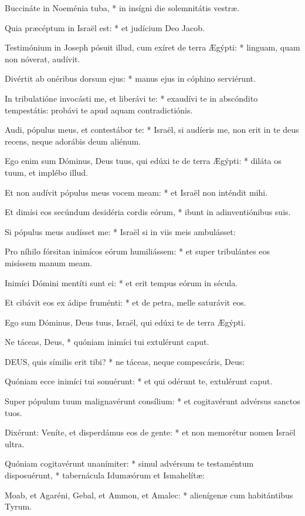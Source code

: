 Buccináte in Noeménia tuba, * in insígni die solemnitátis vestræ.

Quia præcéptum in Israël est: * et judícium Deo Jacob.

Testimónium in Joseph pósuit illud, cum exíret de terra Ægýpti: * linguam, quam non nóverat, audívit.

Divértit ab onéribus dorsum ejus: * manus ejus in cóphino serviérunt.

In tribulatióne invocásti me, et liberávi te: * exaudívi te in abscóndito tempestátis: probávi te apud aquam contradictiónis.

Audi, pópulus meus, et contestábor te: * Israël, si audíeris me, non erit in te deus recens, neque adorábis deum aliénum.

Ego enim sum Dóminus, Deus tuus, qui edúxi te de terra Ægýpti: * diláta os tuum, et implébo illud.

Et non audívit pópulus meus vocem meam: * et Israël non inténdit mihi.

Et dimísi eos secúndum desidéria cordis eórum, * ibunt in adinventiónibus suis.

Si pópulus meus audísset me: * Israël si in viis meis ambulásset:

Pro níhilo fórsitan inimícos eórum humiliássem: * et super tribulántes eos misíssem manum meam.

Inimíci Dómini mentíti sunt ei: * et erit tempus eórum in sécula.

Et cibávit eos ex ádipe fruménti: * et de petra, melle saturávit eos.

 Ego sum Dóminus, Deus tuus, Israël, qui edúxi te de terra Ægýpti.

 Ne táceas, Deus, * quóniam inimíci tui extulérunt caput.


\lettrine[lines=2]{D}{EUS}, quis símilis erit tibi? * ne táceas, neque compescáris, Deus:

Quóniam ecce inimíci tui sonuérunt: * et qui odérunt te, extulérunt caput.

Super pópulum tuum malignavérunt consílium: * et cogitavérunt advérsus sanctos tuos.

Dixérunt: Veníte, et disperdámus eos de gente: * et non memorétur nomen Israël ultra.

Quóniam cogitavérunt unanímiter: * simul advérsum te testaméntum disposuérunt, * tabernácula Idumæórum et Ismahelítæ:

Moab, et Agaréni, Gebal, et Ammon, et Amalec: * alienígenæ cum habitántibus Tyrum.


